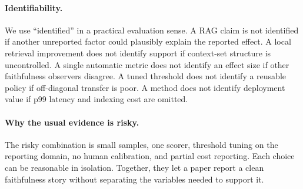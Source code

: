 \paragraph{Identifiability.}
We use ``identified'' in a practical evaluation sense. A RAG claim is not
identified if another unreported factor could plausibly explain the reported
effect. A local retrieval improvement does not identify support if context-set
structure is uncontrolled. A single automatic metric does not identify an
effect size if other faithfulness observers disagree. A tuned threshold does
not identify a reusable policy if off-diagonal transfer is poor. A method does
not identify deployment value if p99 latency and indexing cost are omitted.

\paragraph{Why the usual evidence is risky.}
The risky combination is small samples, one scorer, threshold tuning on the
reporting domain, no human calibration, and partial cost reporting. Each choice
can be reasonable in isolation. Together, they let a paper report a clean
faithfulness story without separating the variables needed to support it.
